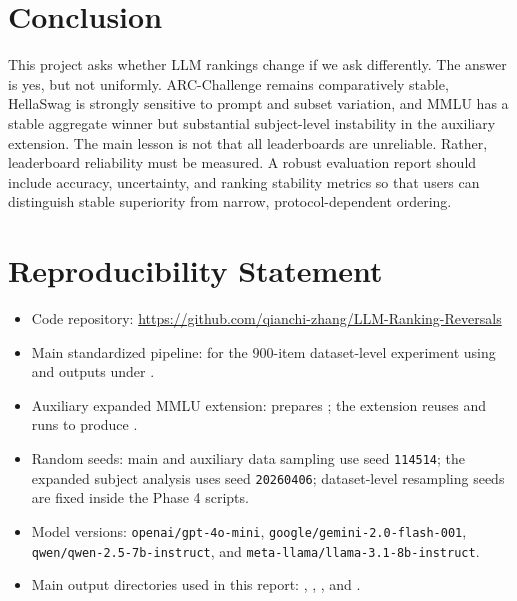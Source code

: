 \documentclass[11pt]{article}
\begin{document}
\section{Conclusion}

This project asks whether LLM rankings change if we ask differently. The answer is yes, but not uniformly. ARC-Challenge remains comparatively stable, HellaSwag is strongly sensitive to prompt and subset variation, and MMLU has a stable aggregate winner but substantial subject-level instability in the auxiliary extension. The main lesson is not that all leaderboards are unreliable. Rather, leaderboard reliability must be measured. A robust evaluation report should include accuracy, uncertainty, and ranking stability metrics so that users can distinguish stable superiority from narrow, protocol-dependent ordering.

\section*{Reproducibility Statement}

\begin{itemize}[leftmargin=*]
    \item Code repository: \url{https://github.com/qianchi-zhang/LLM-Ranking-Reversals}
    \item Main standardized pipeline:  for the 900-item dataset-level experiment using  and outputs under .
    \item Auxiliary expanded MMLU extension:  prepares ; the extension reuses  and runs  to produce .
    \item Random seeds: main and auxiliary data sampling use seed \texttt{114514}; the expanded subject analysis uses seed \texttt{20260406}; dataset-level resampling seeds are fixed inside the Phase 4 scripts.
    \item Model versions: \texttt{openai/gpt-4o-mini}, \texttt{google/gemini-2.0-flash-001}, \texttt{qwen/qwen-2.5-7b-instruct}, and \texttt{meta-llama/llama-3.1-8b-instruct}.
    \item Main output directories used in this report: , , , and .
\end{itemize}
\end{document}
